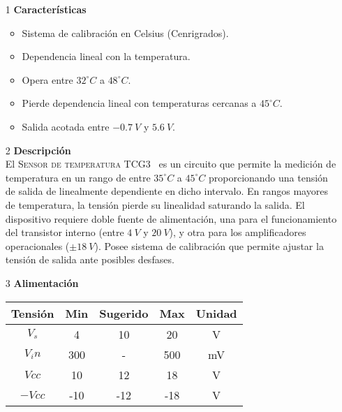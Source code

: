 \documentclass[a4paper]{article}
\begin{document}

\begin{enumerate}
	\item[1] \textbf{Características}
	\begin{itemize}
		\item Sistema de calibración en Celsius (Cenrigrados).
		\item Dependencia lineal con la temperatura.
		\item Opera entre $32^{\circ}C$ a $48^{\circ}C$.
		\item Pierde dependencia lineal con temperaturas cercanas a $45^{\circ}C$.
		\item Salida acotada entre $-0.7 \ V$ y $5.6 \ V$.
	\end{itemize}
	
	\item[2] \textbf{Descripción}\\
		El \textsc{Sensor de temperatura TCG3~\textsuperscript{\textregistered}} es un circuito que permite la medición de temperatura en un rango de entre $35^{\circ}C$ a $45^{\circ}C$ proporcionando una tensión de salida de linealmente dependiente en dicho intervalo. En rangos mayores de temperatura, la tensión pierde su linealidad saturando la salida. El dispositivo requiere doble fuente de alimentación, una para el funcionamiento del transistor interno (entre $4 \ V$ y $20 \ V$), y otra para los amplificadores operacionales ($\pm 18 \ V$). Posee sistema de calibración que permite ajustar la tensión de salida ante posibles desfases.
	
	\item[3] \textbf{Alimentación}\\
	\begin{table}[H]
		\begin{tabular}{ccccc}
			\hline
			Tensión & Min & Sugerido & Max & Unidad \\
			\hline
			$V_s$       & 4   & 10       & 20  & V      \\
			$V_in$      & 300 & -        & 500 & mV     \\
			$Vcc$         & 10  & 12       & 18  & V      \\
			$-Vcc$        & -10 & -12      & -18 & V	\\
			\hline
		\end{tabular}
	\end{table}
	

\end{enumerate}
\end{document}

